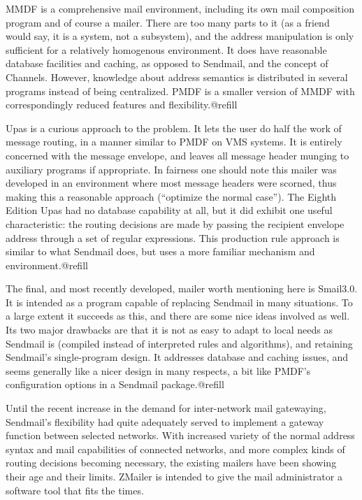 MMDF is a comprehensive mail environment, including its own mail composition
program and of course a mailer.  There are too many parts to it (as a friend
would say, it is a system, not a subsystem), and the address manipulation is
only sufficient for a relatively homogenous environment. It does have 
reasonable database facilities and caching, as opposed to Sendmail, and the
concept of Channels.  However, knowledge about address semantics is
distributed in several programs instead of being centralized.  PMDF is a
smaller version of MMDF with correspondingly reduced features and
flexibility.@refill

Upas is a curious approach to the problem. It lets the user do half the work
of message routing, in a manner similar to PMDF on VMS systems. It is entirely
concerned with the message envelope, and leaves all message header munging to
auxiliary programs if appropriate. In fairness one should note this mailer was
developed in an environment where most message headers were scorned, thus
making this a reasonable approach (``optimize the normal case''). The Eighth
Edition Upas had no database capability at all, but it did exhibit one useful
characteristic: the routing decisions are made by passing the recipient
envelope address through a set of regular expressions. This production rule
approach is similar to what Sendmail does, but uses a more familiar mechanism
and environment.@refill

The final, and most recently developed, mailer worth mentioning here is
Smail3.0. It is intended as a program capable of replacing Sendmail in many
situations. To a large extent it succeeds as this, and there are some nice
ideas involved as well. Its two major drawbacks are that it is not as easy
to adapt to local needs as Sendmail is (compiled instead of interpreted
rules and algorithms), and retaining Sendmail's single-program design.
It addresses database and caching issues, and seems generally like a nicer
design in many respects, a bit like PMDF's configuration options in a
Sendmail package.@refill

Until the recent increase in the demand for inter-network mail gatewaying,
Sendmail's flexibility had quite adequately served to implement a gateway
function between selected networks.  With increased variety of the normal
address syntax and mail capabilities of connected networks, and more complex
kinds of routing decisions becoming necessary, the existing mailers have
been showing their age and their limits.  ZMailer is intended to give the
mail administrator a software tool that fits the times.

